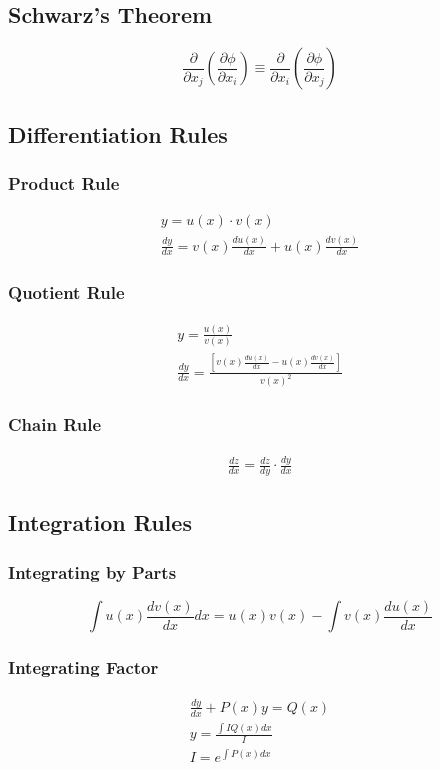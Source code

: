 \documentclass[10pt, oneside, twocolumn]{article}
\numberwithin{equation}{section}
\begin{document}
		\subsection{Schwarz's Theorem}
			\begin{equation}
			\frac{\partial}{\partial x_j}{\left(\frac{\partial \phi}{\partial x_i}\right)}\equiv\frac{\partial}{\partial x_i}{\left(\frac{\partial \phi}{\partial x_j}\right)}
			\end{equation}
		\subsection{Differentiation Rules}
			\subsubsection{Product Rule}
				\begin{gather}
				y=u(x)\cdot v(x)\\
				\frac{dy}{dx}=v(x)\frac{du(x)}{dx}+u(x)\frac{dv(x)}{dx}
				\end{gather}
			\subsubsection{Quotient Rule}
				\begin{gather}
				y=\frac{u(x)}{v(x)}\\
				\frac{dy}{dx}=\frac{\left[v(x)\frac{du(x)}{dx}-u(x)\frac{dv(x)}{dx}\right]}{{v(x)}^2}
				\end{gather}
			\subsubsection{Chain Rule}
				\begin{gather}
				\frac{dz}{dx}=\frac{dz}{dy}\cdot\frac{dy}{dx}
				\end{gather}
		\subsection{Integration Rules}
			\subsubsection{Integrating by Parts}
				\begin{equation}
				\int u(x) \frac{dv(x)}{dx} dx=u(x)v(x)-\int v(x) \frac{du(x)}{dx}
				\end{equation}
			\subsubsection{Integrating Factor}
				\begin{gather}
				\frac{dy}{dx}+P(x)y=Q(x)\\
				y=\frac{\int IQ(x)dx}{I}\\
				I=e^{\int P(x)dx}
				\end{gather}
\end{document}
